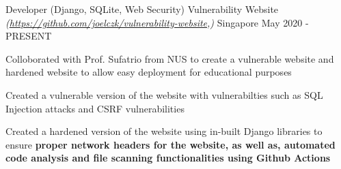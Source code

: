 

\begin{cventries}

  \cventry
  {Developer (Django, SQLite, Web Security)} %
  {Vulnerability Website \textmd{\em\tiny(\url{https://github.com/joelczk/vulnerability-website},)}} %
  {Singapore} %
  {May 2020 - PRESENT} %
  {
    \begin{cvitems} %
      \item {Colloborated with Prof. Sufatrio from NUS to create a vulnerable website and hardened website to allow easy deployment for educational purposes}
      \item {Created a vulnerable version of the website with vulnerabilties such as SQL Injection attacks and CSRF vulnerabilities}
      \item {Created a hardened version of the website using in-built Django libraries to ensure \textbf{proper network headers for the website, as well as, automated code analysis and file scanning functionalities using Github Actions}}
    \end{cvitems}
  }


\end{cventries}
